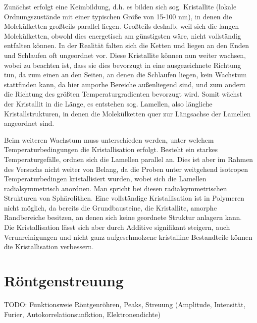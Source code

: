 \documentclass[bigchapter,colorback,accentcolor=tud4b,linedtoc,11pt]{tudreport}
\begin{document}
Zunächst erfolgt eine Keimbildung, d.h. es bilden sich sog. Kristallite (lokale Ordnungszustände mit einer typischen Größe von 15-100 nm), in denen die Molekülketten großteils parallel liegen. Großteils deshalb, weil sich die langen Molekülketten, obwohl dies energetisch am günstigsten wäre, nicht vollständig entfalten können. In der Realität falten sich die Ketten und liegen an den Enden und Schlaufen oft ungeordnet vor. Diese Kristallite können nun weiter wachsen, wobei zu beachten ist, dass sie dies bevorzugt in eine ausgezeichnete Richtung tun, da zum einen an den Seiten, an denen die Schlaufen liegen, kein Wachstum stattfinden kann, da hier amporhe Bereiche außenliegend sind, und zum andern die Richtung des größten Temperaturgradienten bevorzugt wird. Somit wächst der Kristallit in die Länge, es entstehen sog. Lamellen, also längliche Kristallstrukturen, in denen die Molekülketten quer zur Längsachse der Lamellen angeordnet sind.

Beim weiteren Wachstum muss unterschieden werden, unter welchem Temperaturbedingungen die Kristallisation erfolgt. Besteht ein starkes Temperaturgefälle, ordnen sich die Lamellen parallel an. Dies ist aber im Rahmen des Versuchs nicht weiter von Belang, da die Proben unter weitgehend isotropen Temperaturbedingen kristallisiert wurden, wobei sich die Lamellen radialsymmetrisch anordnen. Man spricht bei diesen radialsymmetrischen Strukturen von Sphärolithen. Eine vollständige Kristallisation ist in Polymeren nicht möglich, da bereits die Grundbausteine, die Kristallite, amorphe Randbereiche besitzen, an denen sich keine geordnete Struktur anlagern kann. Die Kristallisation lässt sich aber durch Additive signifikant steigern, auch Verunreinigungen und nicht ganz aufgeschmolzene kristalline Bestandteile können die Kristallisation verbessern.

\section{Röntgenstreuung}
TODO: Funktionsweie Röntgenröhren, Peaks, Streuung (Amplitude, Intensität, Furier, Autokorrelationsunfktion, Elektronendichte)
\end{document}
